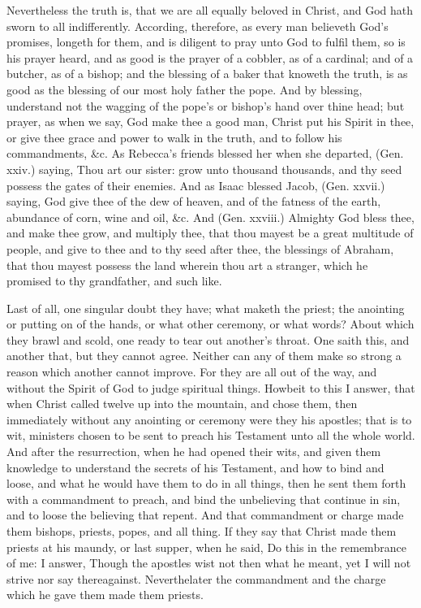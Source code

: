 Nevertheless the truth is, that we are all equally beloved
in Christ, and God hath sworn to all indifferently. 
According, therefore, as every man believeth God's promises,
longeth for them, and is diligent to pray unto God 
to fulfil them, so is his prayer heard, and as good is the 
prayer of a cobbler, as of a cardinal; and of a butcher, 
as of a bishop; and the blessing of a baker that knoweth 
the truth, is as good as the blessing of our most holy 
father the pope. And by blessing, understand not the
wagging of the pope's or bishop's hand over thine head;
but prayer, as when we say, God make thee a good man,
Christ put his Spirit in thee, or give thee grace and power 
to walk in the truth, and to follow his commandments, 
\&c. As Rebecca's friends blessed her when she departed, 
(Gen. xxiv.) saying, Thou art our sister: grow unto 
thousand thousands, and thy seed possess the gates of their 
enemies. And as Isaac blessed Jacob, (Gen. xxvii.) saying,
God give thee of the dew of heaven, and of the fatness 
of the earth, abundance of corn, wine and oil, \&c. And 
(Gen. xxviii.) Almighty God bless thee, and make thee 
grow, and multiply thee, that thou mayest be a great 
multitude of people, and give to thee and to thy seed 
after thee, the blessings of Abraham, that thou mayest 
possess the land wherein thou art a stranger, which he 
promised to thy grandfather, and such like. 

Last of all, one singular doubt they have; what maketh 
the priest; the anointing or putting on of the hands, or 
what other ceremony, or what words? About which they 
brawl and scold, one ready to tear out another's throat. 
One saith this, and another that, but they cannot agree. 
Neither can any of them make so strong a reason which 
another cannot improve. For they are all out of the way, 
and without the Spirit of God to judge spiritual things. 
Howbeit to this I answer, that when Christ called twelve up 
into the mountain, and chose them, then immediately without
any anointing or ceremony were they his apostles; 
that is to wit, ministers chosen to be sent to preach his 
Testament unto all the whole world. And after the resurrection,
when he had opened their wits, and given 
them knowledge to understand the secrets of his Testament, 
and how to bind and loose, and what he would have them 
to do in all things, then he sent them forth with a commandment
to preach, and bind the unbelieving that continue
in sin, and to loose the believing that repent. And 
that commandment or charge made them bishops, priests, 
popes, and all thing. If they say that Christ made them 
priests at his maundy, or last supper, when he said, Do 
this in the remembrance of me: I answer, Though the apostles
wist not then what he meant, yet I will not strive nor 
say thereagainst. Neverthelater the commandment and the 
charge which he gave them made them priests. 

